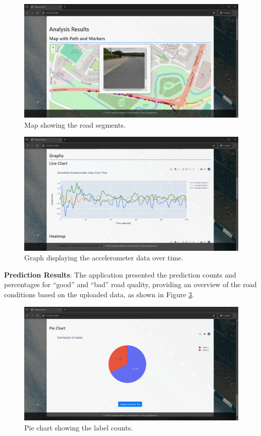\documentclass[a4paper,12pt]{Classes/RoboticsLaTeX}
\begin{document}
\begin{abstracts}
\begin{figure}[H]
\centering
\includegraphics[width=\linewidth]{Figures/Screenshot2.png}
\caption{Map showing the road segments.}
\label{fig:maps}
\end{figure}

\begin{figure}[H]
\centering
\includegraphics[width=\linewidth]{Figures/Screenshot3.png}
\caption{Graph displaying the accelerometer data over time.}
\label{fig:graph}
\end{figure}

\vspace{10pt}

\textbf{Prediction Results}: The application presented the prediction counts and percentages for ``good'' and ``bad'' road quality, providing an overview of the road conditions based on the uploaded data, as shown in Figure \ref{fig:charts}.

\begin{figure}[H]
\centering
\includegraphics[width=\linewidth]{Figures/Screenshot6.png}
\caption{Pie chart showing the label counts.}
\label{fig:charts}
\end{figure}


\end{abstracts}
\end{document}
